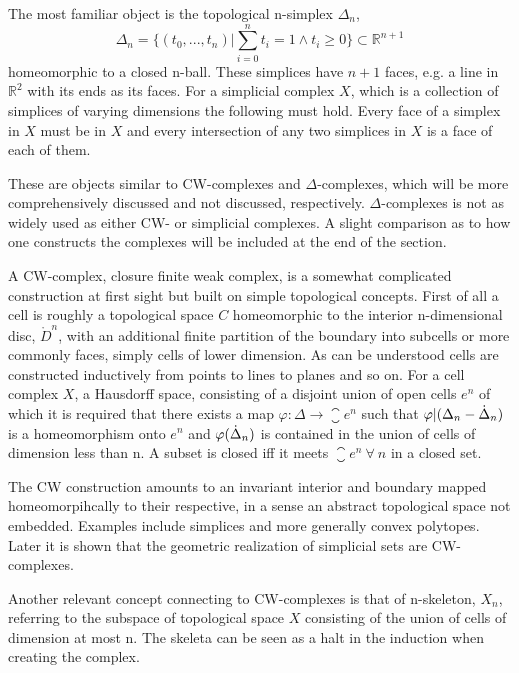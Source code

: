 \documentclass[../../main.tex]{subfiles}
\begin{document}
    The most familiar object is the topological n-simplex $\Delta_n$,
    \begin{equation}
        \Delta_n = \{(t_0, . . . , t_n)  |\sum_{i=0}^{n}t_i=1 \wedge t_i \geq 0\} \subset \mathbb{R}^{n+1}
    \end{equation}
    homeomorphic to a closed n-ball. These simplices have $n+1$ faces, e.g. a line in $\mathbb{R}^2$ with its ends as its faces. For a simplicial complex $X$, which is a collection of simplices of varying dimensions the following must hold. Every face of a simplex in $X$ must be in $X$ and every intersection of any two simplices in $X$ is a face of each of them.
    
    These are objects similar to CW-complexes and $\Delta$-complexes, which will be more comprehensively discussed and not discussed, respectively. $\Delta$-complexes is not as widely used as either CW- or simplicial complexes. A slight comparison as to how one constructs the complexes will be included at the end of the section. 
    
    A CW-complex, closure finite weak complex, is a somewhat complicated construction at first sight but built on simple topological concepts. First of all a cell is roughly a topological space $C$ homeomorphic to the interior n-dimensional disc, $\mathring{D}^n$, with an additional finite partition of the boundary into subcells or more commonly faces, simply cells of lower dimension. As can be understood cells are constructed inductively from points to lines to planes and so on. For a cell complex $X$, a Hausdorff space, consisting of a disjoint union of open cells $e^n$ of which it is required that there exists a map $\varphi:\Delta\to\closure{e}^n$ such that $\varphi|(\Delta_n - \dot{\Delta}_n )$ is a homeomorphism onto $e^n$ and $\varphi(\dot{\Delta}_n)$ is contained in the union of cells of dimension less than n. A subset is closed iff it meets $\closure{e}^n\:\forall \:n$ in a closed set. 
    
    The CW construction amounts to an invariant interior and boundary mapped homeomorpihcally to their respective, in a sense an abstract topological space not embedded. Examples include simplices and more generally convex polytopes. Later it is shown that the geometric realization of simplicial sets are CW-complexes.
    
    Another relevant concept connecting to CW-complexes is that of n-skeleton, $X_n$, referring to the subspace of topological space $X$ consisting of the union of cells of dimension at most n. The skeleta can be seen as a halt in the induction when creating the complex. 
\end{document}
